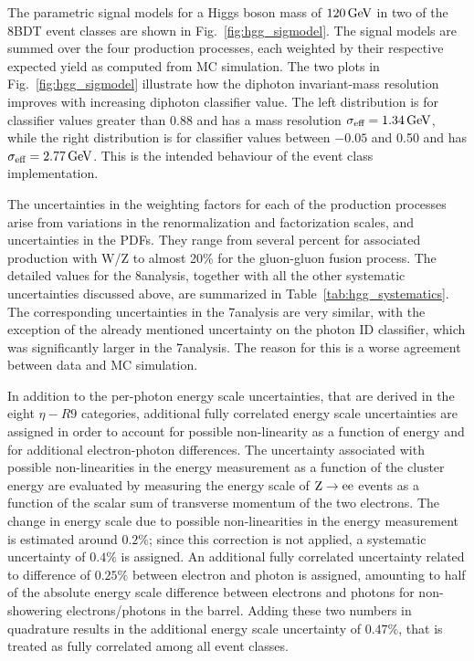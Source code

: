 \documentclass[12pt,twoside,a4paper,cmspaper,final,collab]{cms-tdr}
\begin{document}
The parametric signal models for a Higgs boson mass of
$120\,\text{Ge\hspace{-.08em}V}$ in two of the 8\TeV BDT event classes are shown in
Fig.~\ref{fig:hgg_sigmodel}. The signal models are
summed over the four production processes, each weighted by their respective
expected yield as computed from MC simulation.
The two plots in Fig.~\ref{fig:hgg_sigmodel} illustrate how the
diphoton invariant-mass resolution improves with increasing diphoton classifier value.
The left distribution is for classifier
values greater than 0.88 and has a mass
resolution $\sigma_{\text{eff}} = 1.34\,\text{Ge\hspace{-.08em}V}$, while the
right distribution is for classifier values
between $-0.05$ and 0.50 and has $\sigma_{\text{eff}} = 2.77\,\text{Ge\hspace{-.08em}V}$.
This is the intended behaviour of the event class implementation.

The uncertainties in the weighting factors for each of the production processes
arise from variations in the renormalization
and factorization scales, and uncertainties in the PDFs.
They range from several percent for associated production with W/Z to almost 20\%
for the gluon-gluon fusion process. The detailed values for the 8\TeV analysis, together with
all the other systematic uncertainties discussed above, are summarized in
Table~\ref{tab:hgg_systematics}. The corresponding uncertainties in the 7\TeV analysis are very similar,
with the exception of the already mentioned uncertainty on the photon ID classifier, which
was significantly larger in the 7\TeV analysis.
The reason for this is a worse agreement between data and MC simulation.

In addition to the per-photon energy scale uncertainties, that are derived in the eight $\eta-R9$
categories, additional fully correlated energy scale uncertainties are assigned in order to account
for possible non-linearity as a function of energy and for additional electron-photon
differences. The uncertainty associated with possible non-linearities in the energy measurement as a
function of the cluster energy are evaluated by measuring the energy scale of $\mathrm{Z}\to \mathrm{e}\mathrm{e}$ events as a
function of the scalar sum of  transverse momentum of the two electrons. The change in energy
scale due to possible non-linearities in the energy measurement is
estimated around $0.2\%$; since this correction is not applied, a
systematic uncertainty of $0.4\%$ is assigned.
An additional  fully correlated uncertainty related to difference of $0.25\%$
between  electron and photon is assigned,
amounting to half of the absolute energy scale difference between electrons and photons
for non-showering electrons/photons in the barrel. Adding these two numbers in quadrature results
in the additional energy scale uncertainty of $0.47\%$, that is treated as
fully correlated among all event classes.
\end{document}
